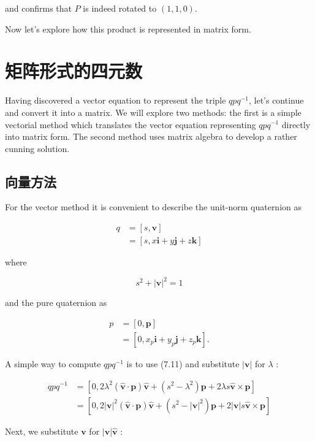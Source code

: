 and confirms that $P$ is indeed rotated to $(1,1,0)$.

Now let's explore how this product is represented in matrix form.

\section{矩阵形式的四元数}
Having discovered a vector equation to represent the triple $q p q^{-1}$, let's continue and convert it into a matrix. We will explore two methods: the first is a simple vectorial method which translates the vector equation representing $q p q^{-1}$ directly into matrix form. The second method uses matrix algebra to develop a rather cunning solution.

\subsection{向量方法}
For the vector method it is convenient to describe the unit-norm quaternion as

$$
\begin{aligned}
q & =[s, \mathbf{v}] \\
& =[s, x \mathbf{i}+y \mathbf{j}+z \mathbf{k}]
\end{aligned}
$$

where

$$
s^{2}+|\mathbf{v}|^{2}=1
$$

and the pure quaternion as

$$
\begin{aligned}
p & =[0, \mathbf{p}] \\
& =\left[0, x_{p} \mathbf{i}+y_{p} \mathbf{j}+z_{p} \mathbf{k}\right] .
\end{aligned}
$$

A simple way to compute $q p q^{-1}$ is to use (7.11) and substitute $|\mathbf{v}|$ for $\lambda$ :

$$
\begin{aligned}
q p q^{-1} & =\left[0,2 \lambda^{2}(\hat{\mathbf{v}} \cdot \mathbf{p}) \hat{\mathbf{v}}+\left(s^{2}-\lambda^{2}\right) \mathbf{p}+2 \lambda s \hat{\mathbf{v}} \times \mathbf{p}\right] \\
& =\left[0,2|\mathbf{v}|^{2}(\hat{\mathbf{v}} \cdot \mathbf{p}) \hat{\mathbf{v}}+\left(s^{2}-|\mathbf{v}|^{2}\right) \mathbf{p}+2|\mathbf{v}| s \hat{\mathbf{v}} \times \mathbf{p}\right]
\end{aligned}
$$

Next, we substitute $\mathbf{v}$ for $|\mathbf{v}| \hat{\mathbf{v}}$ :

